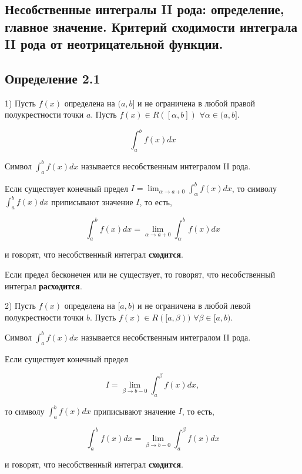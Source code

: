 {
\subsection{Несобственные интегралы II рода: определение, главное значение. Критерий сходимости интеграла II рода от неотрицательной функции. }

\subsection*{Определение 2.1}

1) Пусть \( f(x) \) определена на \( (a, b] \) и не ограничена в любой правой полукрестности точки \( a \). Пусть \( f(x) \in R([\alpha, b]) \) \( \forall \alpha \in (a, b] \).

\[
\int_{a}^{b} f(x)dx
\]

Символ \( \int_{a}^{b} f(x)dx \) называется несобственным интегралом II рода.

Если существует конечный предел \( I = \lim_{\alpha \to a+0} \int_{\alpha}^{b} f(x)dx \), то символу \( \int_{a}^{b} f(x)dx \) приписывают значение \( I \), то есть,



\[
\int_{a}^{b} f(x)dx = \lim_{\alpha \to a+0} \int_{\alpha}^{b} f(x)dx
\]



и говорят, что несобственный интеграл \textbf{сходится}.

Если предел бесконечен или не существует, то говорят, что несобственный интеграл \textbf{расходится}.

2) Пусть \( f(x) \) определена на \( [a, b) \) и не ограничена в любой левой полукрестности точки \( b \). Пусть \( f(x) \in R([a, \beta)) \) \( \forall \beta \in [a, b) \).

Символ \( \int_{a}^{b} f(x)dx \) называется несобственным интегралом II рода.

Если существует конечный предел 



\[
I = \lim_{\beta \to b-0} \int_{a}^{\beta} f(x)dx,
\]



то символу \( \int_{a}^{b} f(x)dx \) приписывают значение \( I \), то есть,



\[
\int_{a}^{b} f(x)dx = \lim_{\beta \to b-0} \int_{a}^{\beta} f(x)dx
\]



и говорят, что несобственный интеграл \textbf{сходится}.

}
